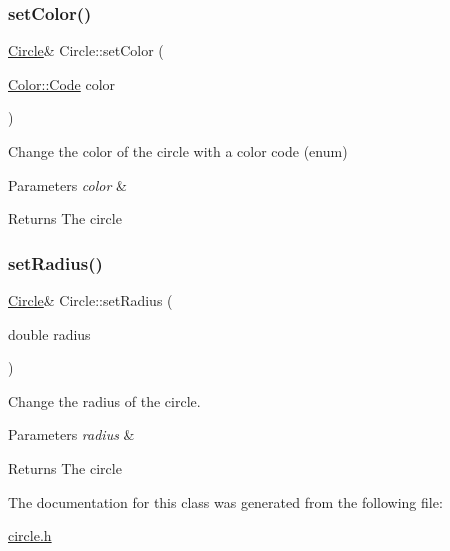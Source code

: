 \subsubsection{\texorpdfstring{set\+Color()}{setColor()}\hspace{0.1cm}{\footnotesize\ttfamily [2/2]}}
{\footnotesize\ttfamily \hyperlink{classCircle}{Circle}\& Circle\+::set\+Color (\begin{DoxyParamCaption}\item[{\hyperlink{classColor_a20a7b04657c1d83fae5d54514d3f1622}{Color\+::\+Code}}]{color }\end{DoxyParamCaption})}



Change the color of the circle with a color code (enum) 


\begin{DoxyParams}{Parameters}
{\em color} & \\
\hline
\end{DoxyParams}
\begin{DoxyReturn}{Returns}
The circle 
\end{DoxyReturn}
\mbox{\label{classCircle_a4c92fd2f5e3149d9d5b5d1a4ce4773fc}} 
\subsubsection{\texorpdfstring{set\+Radius()}{setRadius()}}
{\footnotesize\ttfamily \hyperlink{classCircle}{Circle}\& Circle\+::set\+Radius (\begin{DoxyParamCaption}\item[{double}]{radius }\end{DoxyParamCaption})}



Change the radius of the circle. 


\begin{DoxyParams}{Parameters}
{\em radius} & \\
\hline
\end{DoxyParams}
\begin{DoxyReturn}{Returns}
The circle 
\end{DoxyReturn}


The documentation for this class was generated from the following file\+:\begin{DoxyCompactItemize}
\item 
\hyperlink{circle_8h}{circle.\+h}\end{DoxyCompactItemize}
